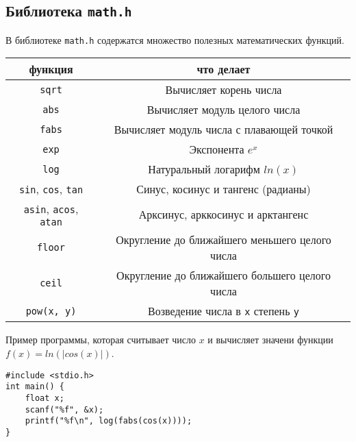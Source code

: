 \documentclass{article}
\begin{document}
\subsection*{Библиотека \texttt{math.h}}
В библиотеке \texttt{math.h} содержатся множество полезных математических функций.

\begin{center}
\begin{tabular}{ c c }
 функция & что делает \\ \hline
 \texttt{sqrt}     & Вычисляет корень числа \\ 
 \texttt{abs}      & Вычисляет модуль целого числа \\ 
 \texttt{fabs}     & Вычисляет модуль числа с плавающей точкой \\ 
 \texttt{exp}      & Экспонента $e^x$ \\ 
 \texttt{log}      & Натуральный логарифм $ln(x)$ \\
 \texttt{sin}, \texttt{cos},  \texttt{tan} & Синус, косинус и тангенс (радианы) \\ 
 \texttt{asin}, \texttt{acos},  \texttt{atan} & Арксинус, арккосинус и арктангенс \\ 
 \texttt{floor}      & Округление до ближайшего меньшего целого числа \\
 \texttt{ceil}       & Округление до ближайшего большего целого числа \\
 \texttt{pow(x, y)}        & Возведение числа в \texttt{x} степень \texttt{y} \\
\end{tabular}
\end{center}

Пример программы, которая считывает число $x$ и вычисляет значени функции $f(x) = ln(|cos(x)|)$.
\begin{lstlisting}
#include <stdio.h>
int main() {
    float x;
    scanf("%f", &x);
    printf("%f\n", log(fabs(cos(x))));
}
\end{lstlisting}
\end{document}
